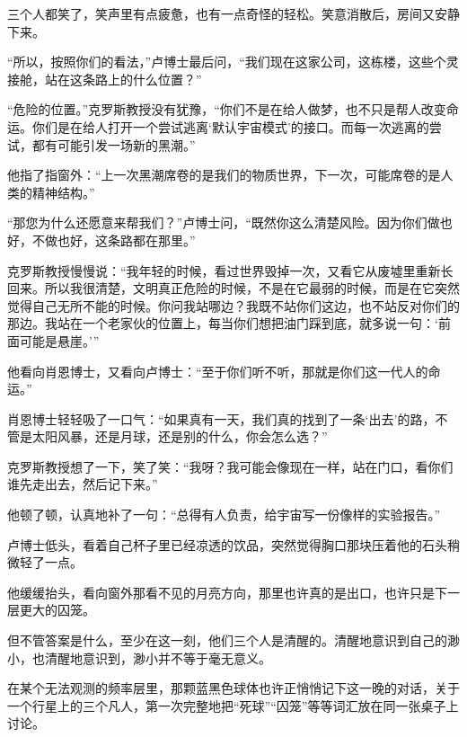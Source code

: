 三个人都笑了，笑声里有点疲惫，也有一点奇怪的轻松。笑意消散后，房间又安静下来。

“所以，按照你们的看法，”卢博士最后问，“我们现在这家公司，这栋楼，这些个灵接舱，站在这条路上的什么位置？”

“危险的位置。”克罗斯教授没有犹豫，“你们不是在给人做梦，也不只是帮人改变命运。你们是在给人打开一个尝试逃离‘默认宇宙模式’的接口。而每一次逃离的尝试，都有可能引发一场新的黑潮。”

他指了指窗外：“上一次黑潮席卷的是我们的物质世界，下一次，可能席卷的是人类的精神结构。”

“那您为什么还愿意来帮我们？”卢博士问，“既然你这么清楚风险。因为你们做也好，不做也好，这条路都在那里。”

克罗斯教授慢慢说：“我年轻的时候，看过世界毁掉一次，又看它从废墟里重新长回来。所以我很清楚，文明真正危险的时候，不是在它最弱的时候，而是在它突然觉得自己无所不能的时候。你问我站哪边？我既不站你们这边，也不站反对你们的那边。我站在一个老家伙的位置上，每当你们想把油门踩到底，就多说一句：‘前面可能是悬崖。’”

他看向肖恩博士，又看向卢博士：“至于你们听不听，那就是你们这一代人的命运。”

肖恩博士轻轻吸了一口气：“如果真有一天，我们真的找到了一条‘出去’的路，不管是太阳风暴，还是月球，还是别的什么，你会怎么选？”

克罗斯教授想了一下，笑了笑：“我呀？我可能会像现在一样，站在门口，看你们谁先走出去，然后记下来。”

他顿了顿，认真地补了一句：“总得有人负责，给宇宙写一份像样的实验报告。”

卢博士低头，看着自己杯子里已经凉透的饮品，突然觉得胸口那块压着他的石头稍微轻了一点。

他缓缓抬头，看向窗外那看不见的月亮方向，那里也许真的是出口，也许只是下一层更大的囚笼。

但不管答案是什么，至少在这一刻，他们三个人是清醒的。清醒地意识到自己的渺小，也清醒地意识到，渺小并不等于毫无意义。

在某个无法观测的频率层里，那颗蓝黑色球体也许正悄悄记下这一晚的对话，关于一个行星上的三个凡人，第一次完整地把“死球”“囚笼”等等词汇放在同一张桌子上讨论。

